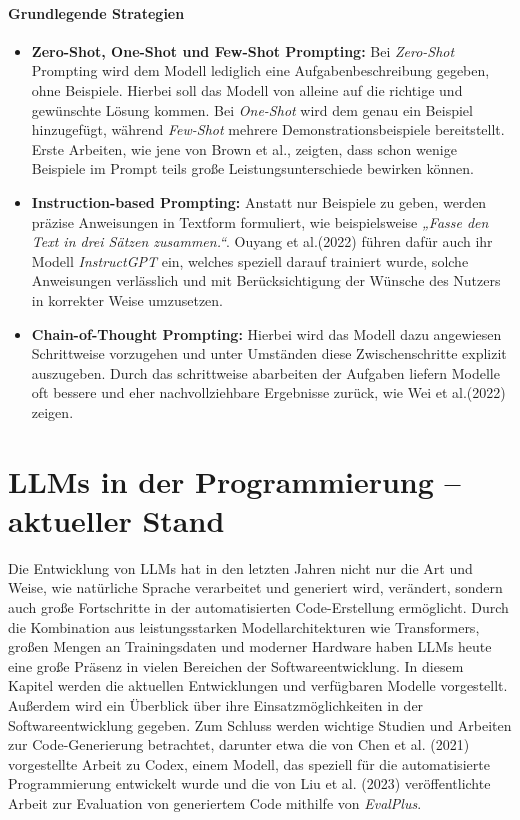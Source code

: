 \documentclass[11pt,a4paper]{article}
\begin{document}
\paragraph{Grundlegende Strategien}
\begin{itemize}
  \item \textbf{Zero-Shot, One-Shot und Few-Shot Prompting:}  
  Bei \emph{Zero-Shot} Prompting wird dem Modell lediglich eine Aufgabenbeschreibung gegeben, ohne Beispiele. Hierbei soll das Modell von alleine auf die richtige und gewünschte Lösung kommen. Bei \emph{One-Shot} wird dem genau ein Beispiel hinzugefügt, während \emph{Few-Shot} mehrere Demonstrationsbeispiele bereitstellt. Erste Arbeiten, wie jene von Brown et al.\cite{brown2020languagemodelsfewshotlearners}, zeigten, dass schon wenige Beispiele im Prompt teils große Leistungsunterschiede bewirken können.

  \item \textbf{Instruction-based Prompting:}  
  Anstatt nur Beispiele zu geben, werden präzise Anweisungen in Textform formuliert, wie beispielsweise \emph{„Fasse den Text in drei Sätzen zusammen.“}. Ouyang et al.(2022) führen dafür auch ihr Modell \emph{InstructGPT} ein, welches speziell darauf trainiert wurde, solche Anweisungen verlässlich und mit Berücksichtigung der Wünsche des Nutzers in korrekter Weise umzusetzen\cite{ouyang2022traininglanguagemodelsfollow}.

  \item \textbf{Chain-of-Thought Prompting:}  
  Hierbei wird das Modell dazu angewiesen Schrittweise vorzugehen und unter Umständen diese Zwischenschritte explizit auszugeben. Durch das schrittweise abarbeiten der Aufgaben liefern Modelle oft bessere und eher nachvollziehbare Ergebnisse zurück, wie Wei et al.(2022) zeigen\cite{wei2023chainofthoughtpromptingelicitsreasoning}.
\end{itemize}


\section{LLMs in der Programmierung – aktueller Stand}
\label{sec:llms_programmierung}
Die Entwicklung von LLMs hat in den letzten Jahren nicht nur die Art und Weise, wie natürliche Sprache verarbeitet und generiert wird, verändert, sondern auch große Fortschritte in der automatisierten Code-Erstellung ermöglicht. Durch die Kombination aus leistungsstarken Modellarchitekturen wie Transformers, großen Mengen an Trainingsdaten und moderner Hardware haben LLMs heute eine große Präsenz in vielen Bereichen der Softwareentwicklung.
In diesem Kapitel werden die aktuellen Entwicklungen und verfügbaren Modelle vorgestellt. Außerdem wird ein Überblick über ihre Einsatzmöglichkeiten in der Softwareentwicklung gegeben. Zum Schluss werden wichtige Studien und Arbeiten zur Code-Generierung betrachtet, darunter etwa die von Chen et al. (2021) vorgestellte Arbeit zu Codex, einem Modell, das speziell für die automatisierte Programmierung entwickelt wurde\cite{chen2021evaluatinglargelanguagemodels} und die von Liu et al. (2023) veröffentlichte Arbeit zur Evaluation von generiertem Code mithilfe von \emph{EvalPlus}\cite{NEURIPS2023_43e9d647}.
\end{document}
